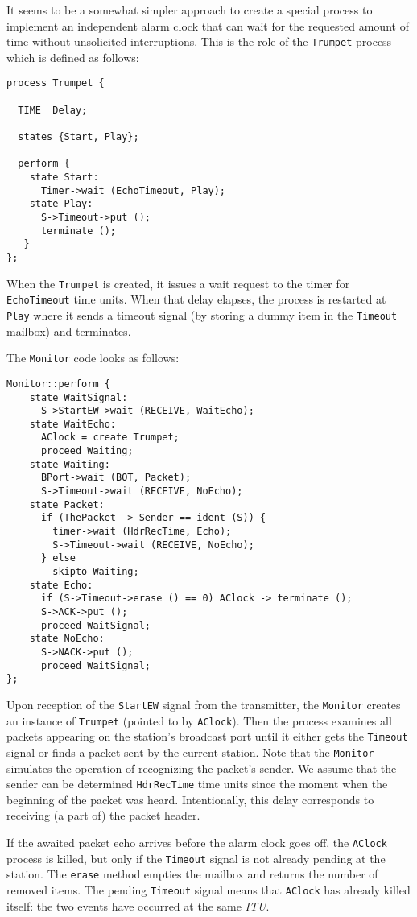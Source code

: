 It seems to be a somewhat simpler approach to create a special process to
implement an independent alarm clock that can wait for the requested amount
of time without unsolicited interruptions.
This is the role of the {\tt Trumpet} process which is defined as follows:
{\small
\begin{verbatim}
process Trumpet {

  TIME  Delay;

  states {Start, Play};

  perform {
    state Start:
      Timer->wait (EchoTimeout, Play);
    state Play:
      S->Timeout->put ();
      terminate ();
   }
};
\end{verbatim} }

When the {\tt Trumpet} is created,
it issues a wait request to the timer for {\tt EchoTimeout}
time units.
When that delay elapses, the process is restarted at {\tt Play}
where it sends a timeout signal (by storing a dummy item in
the {\tt Timeout} mailbox) and terminates.

The {\tt Monitor} code looks as follows:
{\small
\begin{verbatim}
Monitor::perform {
    state WaitSignal:
      S->StartEW->wait (RECEIVE, WaitEcho);
    state WaitEcho:
      AClock = create Trumpet;
      proceed Waiting;
    state Waiting:
      BPort->wait (BOT, Packet);
      S->Timeout->wait (RECEIVE, NoEcho);
    state Packet:
      if (ThePacket -> Sender == ident (S)) {
        timer->wait (HdrRecTime, Echo);
        S->Timeout->wait (RECEIVE, NoEcho);
      } else
        skipto Waiting;
    state Echo:
      if (S->Timeout->erase () == 0) AClock -> terminate ();
      S->ACK->put ();
      proceed WaitSignal;
    state NoEcho:
      S->NACK->put ();
      proceed WaitSignal;
};
\end{verbatim} }

Upon reception of the {\tt StartEW} signal from the transmitter,
the {\tt Monitor} creates an instance of {\tt Trumpet} (pointed to by
{\tt AClock}).
Then the process examines all packets appearing on the station's broadcast port
until it either gets the {\tt Timeout} signal
or finds a packet sent by the current station.
Note that the {\tt Monitor} simulates the operation of recognizing the
packet's sender.
We assume that the sender can be determined {\tt HdrRecTime} time
units since the moment when the beginning of the packet was heard.
Intentionally, this delay corresponds to receiving (a part of) the
packet header.

If the awaited packet echo arrives before the alarm clock goes off,
the {\tt AClock} process is killed, but only if the {\tt Timeout} signal
is not already pending at the station.
The {\tt erase} method empties the mailbox and returns the number of
removed items.
The pending {\tt Timeout} signal means that {\tt AClock} has already killed
itself: the two events have occurred at the same {\em ITU}.

